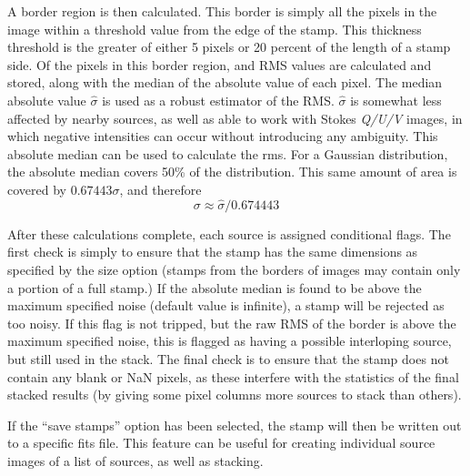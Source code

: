 \documentclass{article}
\begin{document}
A border region is then calculated.  This border is simply all the pixels in 
the image within a threshold value from the edge of the stamp. This thickness 
threshold is the greater of either 5 pixels or 20 percent of the length of a 
stamp side. Of the pixels in this border region, and RMS values are 
calculated and stored, along with the median of the absolute value of each 
pixel. The median absolute value $\hat\sigma$ is used as a robust estimator of 
the RMS.  $\hat\sigma$ is somewhat less affected by nearby sources, as well as 
able to work with Stokes \emph{Q/U/V} images, in which negative intensities can occur without introducing any ambiguity.  This absolute median can be used to 
calculate the rms.  For a Gaussian distribution, the absolute median 
covers 50\% of the distribution.  This same amount of area is covered by 
$0.67443\sigma$, and therefore
$$\sigma \approx \hat\sigma/0.674443$$
\par

After these calculations complete, each source is assigned conditional flags.
The first check is simply to ensure that the stamp has the same dimensions as
specified by the size option (stamps from the borders of images may contain only
a portion of a full stamp.) If the absolute median is found to be above 
the maximum specified noise (default value is infinite), a stamp will be 
rejected as too noisy.  If this flag is not tripped, but the raw RMS of the 
border is above the maximum specified noise, this is flagged as having a 
possible interloping source, but still used in the stack.  The final check is to
ensure that the stamp does not contain any blank or NaN pixels, as these 
interfere with the statistics of the final stacked results (by giving some
pixel columns more sources to stack than others).\par

If the ``save stamps'' option has been selected, the stamp will then be written 
out to a specific fits file.  This feature can be useful for creating individual
source images of a list of sources, as well as stacking.
\end{document}
